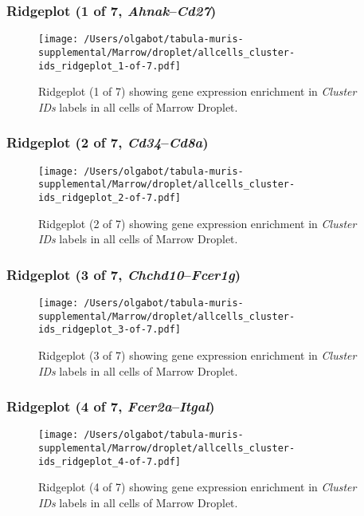 \clearpage

\subsubsection{Ridgeplot (1 of 7, \emph{Ahnak}--\emph{Cd27})}
\begin{figure}[h]
\centering
\texttt{[image: /Users/olgabot/tabula-muris-supplemental/Marrow/droplet/allcells\_cluster-ids\_ridgeplot\_1-of-7.pdf]}

\caption{ Ridgeplot (1 of 7)  showing gene expression enrichment in \emph{Cluster IDs} labels in all cells of Marrow Droplet. }
\end{figure}


\clearpage

\subsubsection{Ridgeplot (2 of 7, \emph{Cd34}--\emph{Cd8a})}
\begin{figure}[h]
\centering
\texttt{[image: /Users/olgabot/tabula-muris-supplemental/Marrow/droplet/allcells\_cluster-ids\_ridgeplot\_2-of-7.pdf]}

\caption{ Ridgeplot (2 of 7)  showing gene expression enrichment in \emph{Cluster IDs} labels in all cells of Marrow Droplet. }
\end{figure}


\clearpage

\subsubsection{Ridgeplot (3 of 7, \emph{Chchd10}--\emph{Fcer1g})}
\begin{figure}[h]
\centering
\texttt{[image: /Users/olgabot/tabula-muris-supplemental/Marrow/droplet/allcells\_cluster-ids\_ridgeplot\_3-of-7.pdf]}

\caption{ Ridgeplot (3 of 7)  showing gene expression enrichment in \emph{Cluster IDs} labels in all cells of Marrow Droplet. }
\end{figure}


\clearpage

\subsubsection{Ridgeplot (4 of 7, \emph{Fcer2a}--\emph{Itgal})}
\begin{figure}[h]
\centering
\texttt{[image: /Users/olgabot/tabula-muris-supplemental/Marrow/droplet/allcells\_cluster-ids\_ridgeplot\_4-of-7.pdf]}

\caption{ Ridgeplot (4 of 7)  showing gene expression enrichment in \emph{Cluster IDs} labels in all cells of Marrow Droplet. }
\end{figure}


